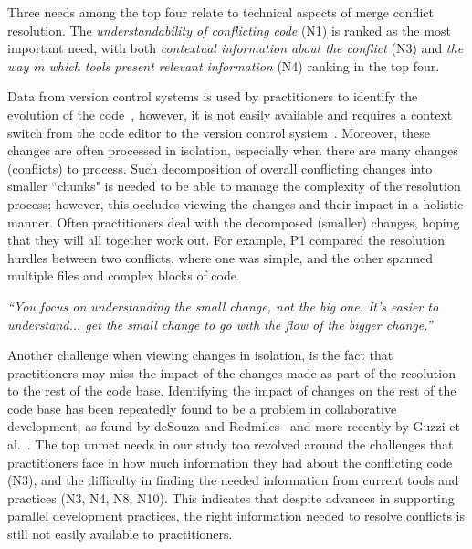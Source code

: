 
Three needs among the top four relate to technical aspects of merge conflict resolution.
The \textit{understandability of conflicting code} (N1) is ranked as the most important need, with both \textit{contextual information about the conflict} (N3) and \textit{the way in which tools present relevant information} (N4) ranking in the top four.

Data from version control systems is used by practitioners to identify the evolution of the code~\cite{Mihai_lenses}, however, it is not easily available and requires a context switch from the code editor to the version control system~\cite{Guzzi2015}. 
Moreover, these changes are often processed in isolation, especially when there are many changes (conflicts) to process. 
Such decomposition of overall conflicting changes into smaller ``chunks" is needed to be able to manage the complexity of the resolution process; however, this occludes viewing the changes and their impact in a holistic manner. 
Often practitioners deal with the decomposed (smaller) changes, hoping that they will all together work out. 
For example, P1 compared the resolution hurdles between two conflicts, where one was simple, and the other spanned multiple files and complex blocks of code.
\begin{quoting}
\textit{``You focus on understanding the small change, not the big one. It's easier to understand... get the small change to go with the flow of the bigger change.''}
\end{quoting}

Another challenge when viewing changes in isolation, is the fact that practitioners may miss the impact of the changes made as part of the resolution to the rest of the code base. 
Identifying the impact of changes on the rest of the code base has been repeatedly found to be a problem in collaborative development, as found by deSouza and Redmiles~\cite{deSouza2008} and more recently by Guzzi et al.~\cite{Guzzi2015}. 
The top unmet needs in our study too revolved around the challenges that practitioners face in how much information they had about the conflicting code (N3), and the difficulty in finding the needed information from current tools and practices (N3, N4, N8, N10). 
This indicates that despite advances in supporting parallel development practices, the right information needed to resolve conflicts is still not easily available to practitioners. 

